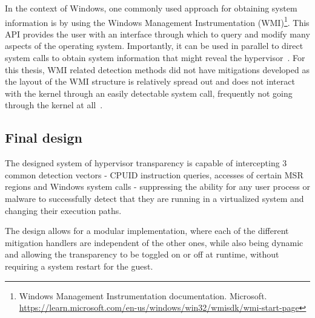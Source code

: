 In the context of Windows, one commonly used approach for obtaining system information is by using the Windows Management Instrumentation (WMI)\footnote{Windows Management Instrumentation documentation. Microsoft. \url{https://learn.microsoft.com/en-us/windows/win32/wmisdk/wmi-start-page}}.
This API provides the user with an interface through which to query and modify many aspects of the operating system. 
Importantly, it can be used in parallel to direct system calls to obtain system information that might reveal the hypervisor~\cite{graeber2015abusing}.
For this thesis, WMI related detection methods did not have mitigations developed as the layout of the WMI structure is relatively spread out and 
does not interact with the kernel through an easily detectable system call, frequently not going through the kernel at all~\cite{wmi-structure}.

\subsection{Final design}
The designed system of hypervisor transparency is capable of intercepting 3 common detection vectors - CPUID instruction queries, accesses of certain MSR regions and Windows system calls - 
suppressing the ability for any user process or malware to successfully detect that they are running in a virtualized system and changing their execution paths. 

The design allows for a modular implementation, where each of the different mitigation handlers are independent of the other ones, 
while also being dynamic and allowing the transparency to be toggled on or off at runtime, without requiring a system restart for the guest.




